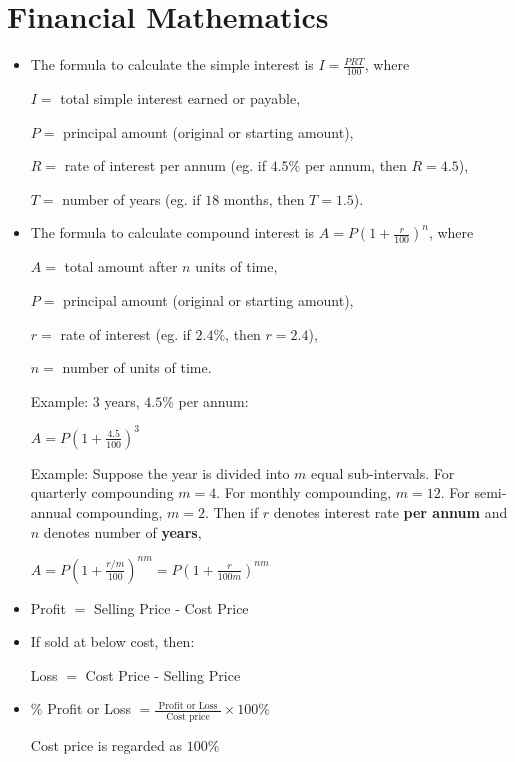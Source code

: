 \documentclass[twocolumn]{article}
\begin{document}
\section*{Financial Mathematics}

\begin{itemize}
\item  The formula to calculate the simple interest is $I=\frac{P R T}{100}$, where 

$I=$ total simple interest earned or payable,

$P=$ principal amount (original or starting amount),

$R=$ rate of interest per annum (eg. if $4.5\%$ per annum, then $R=4.5$),

$T=$ number of years (eg. if $18$ months, then $T=1.5$).

\item The formula to calculate compound interest is $A=P\left(1+\frac{r}{100}\right)^n$, where 

$A=$ total amount after $n$ units of time,

$P=$ principal amount (original or starting amount),

$r=$ rate of interest (eg. if $2.4\%$, then $r=2.4$),

$n=$ number of units of time.

Example: $3$ years, $4.5 \%$ per annum:

$A = P\left(1+\frac{4.5}{100}\right)^3$

Example: Suppose the year is divided into $m$ equal sub-intervals. For quarterly compounding $m=4$. For monthly compounding, $m=12$. For semi-annual compounding, $m=2$. Then if $r$ denotes interest rate {\bf per annum} and $n$ denotes number of {\bf years},

$A=P\left(1+\frac{r/m}{100}\right)^{nm} = P\left(1+\frac{r}{100m}\right)^{nm}$

\item 

Profit $=$ Selling Price - Cost Price

\item If sold at below cost, then:

Loss $=$ Cost Price - Selling Price

\item 

$\%$ Profit or Loss $=\frac{\text { Profit or Loss }}{\text { Cost price }} \times 100 \%$

Cost price is regarded as $100 \%$


\end{itemize}
\end{document}
